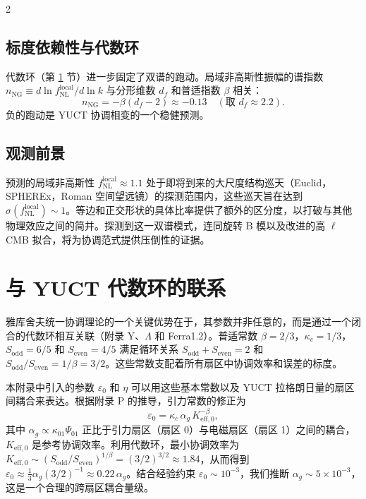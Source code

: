 \documentclass[11pt,a4paper]{article}
\begin{document}
\begin{multicols}{2}
		\subsection{标度依赖性与代数环}
		代数环（第 \ref{sec:algebraic} 节）进一步固定了双谱的跑动。局域非高斯性振幅的谱指数 $n_{\mathrm{NG}} \equiv d\ln f_{\mathrm{NL}}^{\mathrm{local}} / d\ln k$ 与分形维数 $d_f$ 和普适指数 $\beta$ 相关：
		\begin{equation}
			n_{\mathrm{NG}} = -\beta (d_f - 2) \approx -0.13 \quad (\text{取 } d_f \approx 2.2).
		\end{equation}
		负的跑动是 YUCT 协调相变的一个稳健预测。
		
		\subsection{观测前景}
		预测的局域非高斯性 $f_{\mathrm{NL}}^{\mathrm{local}} \approx 1.1$ 处于即将到来的大尺度结构巡天（Euclid，SPHEREx，Roman 空间望远镜）的探测范围内，这些巡天旨在达到 $\sigma(f_{\mathrm{NL}}^{\mathrm{local}}) \sim 1$。等边和正交形状的具体比率提供了额外的区分度，以打破与其他物理效应之间的简并。探测到这一双谱模式，连同旋转 B 模以及改进的高 $\ell$ CMB 拟合，将为协调范式提供压倒性的证据。
		
		\section{与 YUCT 代数环的联系}
		\label{sec:algebraic}
		
		雅库舍夫统一协调理论的一个关键优势在于，其参数并非任意的，而是通过一个闭合的代数环相互关联（附录 Y、$\Lambda$ 和 Ferra1.2）。普适常数 $\beta=2/3$，$\kappa_c=1/3$，$S_{\mathrm{odd}}=6/5$ 和 $S_{\mathrm{even}}=4/5$ 满足循环关系 $S_{\mathrm{odd}}+S_{\mathrm{even}}=2$ 和 $S_{\mathrm{odd}}/S_{\mathrm{even}} = 1/\beta = 3/2$。这些常数支配着所有扇区中协调效率和误差的标度。
		
		本附录中引入的参数 $\varepsilon_0$ 和 $\eta$ 可以用这些基本常数以及 YUCT 拉格朗日量的扇区间耦合来表达。根据附录 P 的推导，引力常数的修正为
		\begin{equation}
			\varepsilon_0 = \kappa_c \, \alpha_g \, K_{\mathrm{eff},0}^{-\beta},
		\end{equation}
		其中 $\alpha_g \propto \kappa_{01} \Psi_{01}$ 正比于引力扇区（扇区 0）与电磁扇区（扇区 1）之间的耦合，$K_{\mathrm{eff},0}$ 是参考协调效率。利用代数环，最小协调效率为 $K_{\mathrm{eff},0} \sim (S_{\mathrm{odd}}/S_{\mathrm{even}})^{1/\beta} = (3/2)^{3/2} \approx 1.84$，从而得到 $\varepsilon_0 \approx \frac{1}{3} \alpha_g (3/2)^{-1} \approx 0.22\,\alpha_g$。结合经验约束 $\varepsilon_0 \sim 10^{-3}$，我们推断 $\alpha_g \sim 5\times10^{-3}$，这是一个合理的跨扇区耦合量级。
		

\end{multicols}
\end{document}
